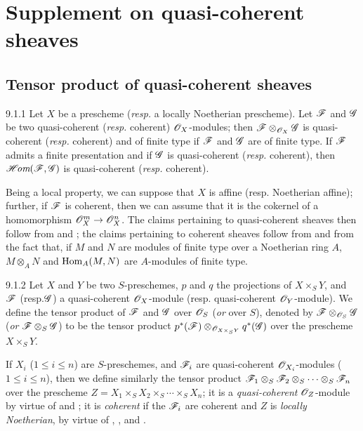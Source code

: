 \section{Supplement on quasi-coherent sheaves}
\label{1-schemes-9}

\subsection{Tensor product of quasi-coherent sheaves}
\label{1-schemes-9.1}

\begin{envs}[Proposition]{9.1.1}
\label{prop-1.9.1.1}
Let $X$ be a prescheme (\emph{resp.} a locally Noetherian prescheme). Let $\mathscr{F}$ and
$\mathscr{G}$ be two quasi-coherent (\emph{resp.} coherent) $\mathscr{O}_X$-modules; then
$\mathscr{F}\otimes_{\mathscr{O}_X}\mathscr{G}$ is quasi-coherent (\emph{resp.} coherent) and
of finite type if $\mathscr{F}$ and $\mathscr{G}$ are of finite type. If
$\mathscr{F}$ admits a finite presentation and if $\mathscr{G}$ is quasi-coherent
(\emph{resp.} coherent), then $\mathscr{H}\!\textit{om}(\mathscr{F},\mathscr{G})$ is quasi-coherent
(\emph{resp.} coherent).
\end{envs}

Being a local property, we can suppose that $X$ is affine (resp. Noetherian
affine); further, if $\mathscr{F}$ is coherent, then we can assume that it is the
cokernel of a homomorphism $\mathscr{O}_X^m\to\mathscr{O}_X^n$. The claims pertaining to
quasi-coherent sheaves then follow from  and ; the
claims pertaining to coherent sheaves follow from  and from the fact
that, if $M$ and $N$ are modules of finite type over a Noetherian ring $A$,
$M\otimes_A N$ and ${\mathop{\mathrm{Hom}}\nolimits}_A(M,N)$ are $A$-modules of finite type.

\begin{envs}[Definition]{9.1.2}
\label{defn-1.9.1.2}
Let $X$ and $Y$ be two $S$-preschemes, $p$ and
$q$ the projections of $X\times_S Y$, and $\mathscr{F}$ (resp.$\mathscr{G}$) a
quasi-coherent $\mathscr{O}_X$-module (resp. quasi-coherent $\mathscr{O}_Y$-module). We define the
tensor product of $\mathscr{F}$ and $\mathscr{G}$ over $\mathscr{O}_S$ (\emph{or} over $S$),
denoted by $\mathscr{F}\otimes_{\mathscr{O}_S}\mathscr{G}$ (\emph{or}
$\mathscr{F}\otimes_S\mathscr{G}$) to be the tensor product
$p^*(\mathscr{F})\otimes_{\mathscr{O}_{X\times_S Y}}q^*(\mathscr{G})$ over the
prescheme $X\times_S Y$.
\end{envs}

If $X_i$ ($1\leqslant i\leqslant n$) are $S$-preschemes, and $\mathscr{F}_i$ are quasi-coherent
$\mathscr{O}_{X_i}$-modules ($1\leqslant i\leqslant n$), then we define similarly the tensor product
$\mathscr{F}_1\otimes_S\mathscr{F}_2\otimes_S\cdots\otimes_S\mathscr{F}_n$ over the
prescheme $Z=X_1\times_S X_2\times_S\cdots\times_S X_n$; it is a
\emph{quasi-coherent} $\mathscr{O}_Z$-module by virtue of  and
; it is \emph{coherent} if the $\mathscr{F}_i$ are coherent and
$Z$ is \emph{locally Noetherian}, by virtue of ,
, and .

